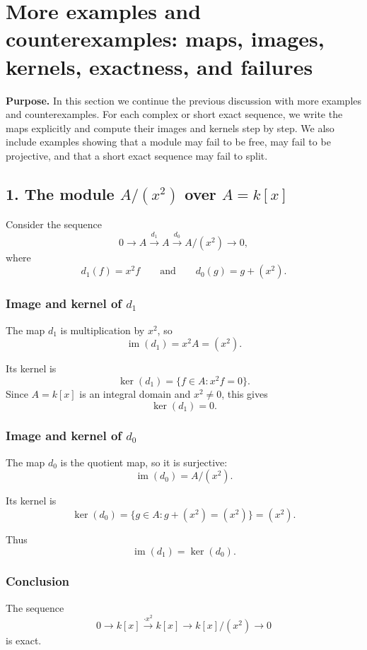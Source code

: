\documentclass[12pt,a4paper]{article}
\theoremstyle{notespace}
\theoremstyle{definition}
\begin{document}
\section{More examples and counterexamples: maps, images, kernels, exactness, and failures}

\textbf{Purpose.}
In this section we continue the previous discussion with more examples and counterexamples.
For each complex or short exact sequence, we write the maps explicitly and compute their images and kernels step by step.
We also include examples showing that a module may fail to be free, may fail to be projective, and that a short exact sequence may fail to split.

\subsection{1. The module \(A/(x^2)\) over \(A=k[x]\)}

Consider the sequence
\[
0 \longrightarrow A \xrightarrow{d_1} A \xrightarrow{d_0} A/(x^2) \longrightarrow 0,
\]
where
\[
d_1(f)=x^2f
\qquad\text{and}\qquad
d_0(g)=g+(x^2).
\]

\subsubsection*{Image and kernel of \(d_1\)}

The map \(d_1\) is multiplication by \(x^2\), so
\[
\operatorname{im}(d_1)=x^2A=(x^2).
\]

Its kernel is
\[
\ker(d_1)=\{f\in A : x^2f=0\}.
\]
Since \(A=k[x]\) is an integral domain and \(x^2\neq 0\), this gives
\[
\ker(d_1)=0.
\]

\subsubsection*{Image and kernel of \(d_0\)}

The map \(d_0\) is the quotient map, so it is surjective:
\[
\operatorname{im}(d_0)=A/(x^2).
\]

Its kernel is
\[
\ker(d_0)=\{g\in A : g+(x^2)=(x^2)\}=(x^2).
\]

Thus
\[
\operatorname{im}(d_1)=\ker(d_0).
\]

\subsubsection*{Conclusion}

The sequence
\[
0 \longrightarrow k[x] \xrightarrow{\cdot x^2} k[x] \longrightarrow k[x]/(x^2) \longrightarrow 0
\]
is exact.
\end{document}
